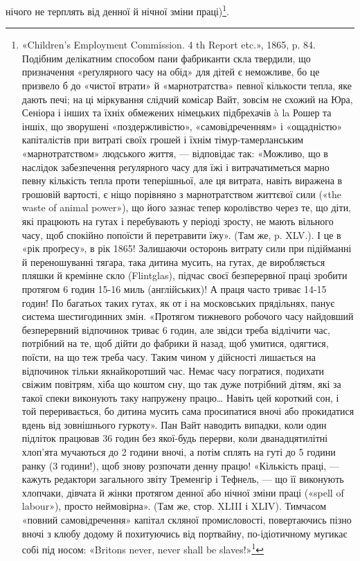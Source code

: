 нічого не терплять від денної й нічної зміни праці)\footnote{
«Children’s Employment Commission. 4 th Report etc.», 1865,
p. 84. Подібним делікатним способом пани фабриканти скла твердили, що
призначення «реґулярного часу на обід» для дітей є неможливе, бо це
призвело б до «чистої втрати» й «марнотратства» певної кількости тепла,
яке дають печі; на ці міркування слідчий комісар Вайт, зовсім не схожий
на Юра, Сеніора і інших та їхніх обмежених німецьких підбрехачів à la
Рошер та іншіх, що зворушені «поздержливістю», «самовідреченням» і
«ощадністю» капіталістів при витраті своїх грошей і їхнім тімур-тамерланським
«марнотратством» людського життя, — відповідає так: «Можливо,
що в наслідок забезпечення реґулярного часу для їжі і витрачатиметься
марно певну кількість тепла проти теперішньої, але ця витрата,
навіть виражена в грошовій вартості, є ніщо порівняно з марнотратством
життєвої сили («the waste of animal power»), що його зазнає тепер королівство
через те, що діти, які працюють на гутах і перебувають у періоді
зросту, не мають вільного часу, щоб спокійно попоїсти й перетравити
їжу». (Там же, p. XLV.). І це в «рік проґресу», в рік 1865! Залишаючи
осторонь витрату сили при підійманні й переношуванні тягара, така
дитина мусить, на гутах, де виробляється пляшки й кремінне скло (Flintglas),
підчас своєї безперервної праці зробити протягом 6 годин 15-16
миль (англійських)! А праця часто триває 14-15 годин! По багатьох
таких гутах, як от і на московських прядільнях, панує система шестигодинних
змін. «Протягом тижневого робочого часу найдовший безперервний
відпочинок триває 6 годин, але звідси треба відлічити час, потрібний на
те, щоб дійти до фабрики й назад, щоб умитися, одягтися, поїсти, на що
теж треба часу. Таким чином у дійсності лишається на відпочинок тільки
якнайкоротший час. Немає часу погратися, подихати свіжим повітрям,
хіба що коштом сну, що так дуже потрібний дітям, які за такої спеки
виконують таку напружену працю\dots{} Навіть цей короткий сон, і той переривається,
бо дитина мусить сама просипатися вночі або прокидатися вдень
від зовнішнього гуркоту». Пан Вайт наводить випадки, коли один підліток
працював 36 годин без якої-будь перерви, коли дванадцятилітні хлоп’ята
мучаються до 2 години вночі, а потім сплять на гуті до 5 години ранку
(3 години!), щоб знову розпочати денну працю! «Кількість праці, — кажуть
редактори загального звіту Тременгір і Тефнель, — що її виконують
хлопчаки, дівчата й жінки протягом денної або нічної зміни праці («spell of
labour»), просто неймовірна». (Там же, стор. XLIII і XLIV). Тимчасом
«повний самовідречення» капітал скляної промисловості, повертаючись
пізно вночі з клюбу додому й похитуючись від портвайну, по-ідіотичному
мугикає собі під носом: «Britons never, never shall be slaves!»\footnote*{
Ніколи, ніколи британці не будуть рабами. \emph{Ред.}}
}.

